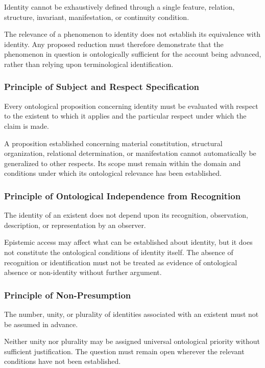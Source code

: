 Identity cannot be exhaustively defined through a single
feature, relation, structure, invariant, manifestation,
or continuity condition.

The relevance of a phenomenon to identity does not
establish its equivalence with identity. Any proposed
reduction must therefore demonstrate that the phenomenon
in question is ontologically sufficient for the account
being advanced, rather than relying upon terminological
identification.

\subsubsection{Principle of Subject and Respect Specification}

Every ontological proposition concerning identity must
be evaluated with respect to the existent to which it
applies and the particular respect under which the claim
is made.

A proposition established concerning material constitution,
structural organization, relational determination, or
manifestation cannot automatically be generalized to
other respects. Its scope must remain within the domain
and conditions under which its ontological relevance
has been established.

\subsubsection{Principle of Ontological Independence from Recognition}

The identity of an existent does not depend upon its
recognition, observation, description, or representation
by an observer.

Epistemic access may affect what can be established about
identity, but it does not constitute the ontological
conditions of identity itself. The absence of recognition
or identification must not be treated as evidence of
ontological absence or non-identity without further
argument.

\subsubsection{Principle of Non-Presumption}

The number, unity, or plurality of identities associated
with an existent must not be assumed in advance.

Neither unity nor plurality may be assigned universal
ontological priority without sufficient justification.
The question must remain open wherever the relevant
conditions have not been established.

